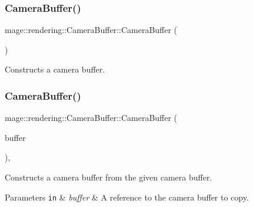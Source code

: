 \subsubsection{\texorpdfstring{Camera\+Buffer()}{CameraBuffer()}\hspace{0.1cm}{\footnotesize\ttfamily [1/3]}}
{\footnotesize\ttfamily mage\+::rendering\+::\+Camera\+Buffer\+::\+Camera\+Buffer (\begin{DoxyParamCaption}{ }\end{DoxyParamCaption})\hspace{0.3cm}{\ttfamily [noexcept]}}

Constructs a camera buffer. \hypertarget{structmage_1_1rendering_1_1_camera_buffer_a08ff60a4695d723218c5cffb4b95cc59}{}\label{structmage_1_1rendering_1_1_camera_buffer_a08ff60a4695d723218c5cffb4b95cc59} 
\subsubsection{\texorpdfstring{Camera\+Buffer()}{CameraBuffer()}\hspace{0.1cm}{\footnotesize\ttfamily [2/3]}}
{\footnotesize\ttfamily mage\+::rendering\+::\+Camera\+Buffer\+::\+Camera\+Buffer (\begin{DoxyParamCaption}\item[{const \hyperlink{structmage_1_1rendering_1_1_camera_buffer}{Camera\+Buffer} \&}]{buffer }\end{DoxyParamCaption})\hspace{0.3cm}{\ttfamily [default]}, {\ttfamily [noexcept]}}

Constructs a camera buffer from the given camera buffer.


\begin{DoxyParams}[1]{Parameters}
\mbox{\tt in}  & {\em buffer} & A reference to the camera buffer to copy. \\
\hline
\end{DoxyParams}
\hypertarget{structmage_1_1rendering_1_1_camera_buffer_a16f0d0938bb4e4174461c3a8c8ad3e20}{}\label{structmage_1_1rendering_1_1_camera_buffer_a16f0d0938bb4e4174461c3a8c8ad3e20} 
